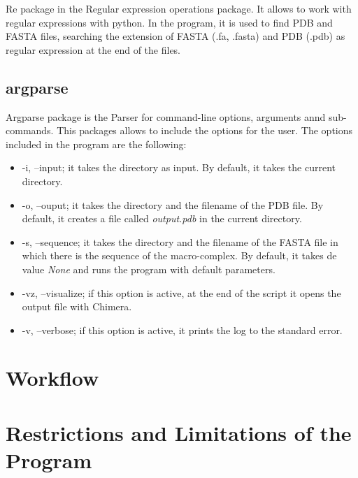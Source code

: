 \documentclass[a4paper,12pt]{report}
\begin{document}
Re package in the Regular expression operations package. It allows to work with regular expressions with python. In the program, it is used to find PDB and FASTA files, searching the extension of FASTA (.fa, .fasta) and PDB (.pdb) as regular expression at the end of the files.


\subsection{argparse}

Argparse package is the Parser for command-line options, arguments annd sub-commands. This packages allows to include the options for the user. The options included in the program are the following:

\begin{itemize}
 \item -i, --input; it takes the directory as input. By default, it takes the current directory.
 \item -o, --ouput; it takes the directory and the filename of the PDB file. By default, it creates a file called \textit{output.pdb} in the current directory.
 \item -s, --sequence; it takes the directory and the filename of the FASTA file in which there is the sequence of the macro-complex. By default, it takes de value \textit{None} and runs the program with default parameters.
 \item -vz, --visualize; if this option is active, at the end of the script it opens the output file with Chimera.
 \item -v, --verbose; if this option is active, it prints the log to the standard error. 
\end{itemize}


\section{Workflow}




\section{Restrictions and Limitations of the Program}
\end{document}
